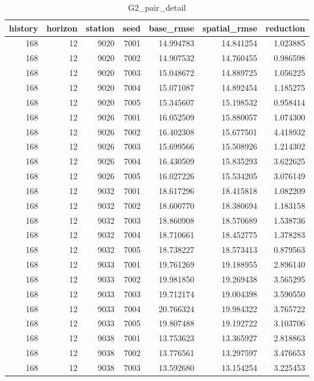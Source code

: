 \begin{table}
\caption{G2_pair_detail}
\label{tab:G2_pair_detail}
\begin{tabular}{rrrrrrr}
\toprule
history & horizon & station & seed & base\_rmse & spatial\_rmse & reduction \\
\midrule
168 & 12 & 9020 & 7001 & 14.994783 & 14.841254 & 1.023885 \\
168 & 12 & 9020 & 7002 & 14.907532 & 14.760455 & 0.986598 \\
168 & 12 & 9020 & 7003 & 15.048672 & 14.889725 & 1.056225 \\
168 & 12 & 9020 & 7004 & 15.071087 & 14.892454 & 1.185275 \\
168 & 12 & 9020 & 7005 & 15.345607 & 15.198532 & 0.958414 \\
168 & 12 & 9026 & 7001 & 16.052509 & 15.880057 & 1.074300 \\
168 & 12 & 9026 & 7002 & 16.402308 & 15.677501 & 4.418932 \\
168 & 12 & 9026 & 7003 & 15.699566 & 15.508926 & 1.214302 \\
168 & 12 & 9026 & 7004 & 16.430509 & 15.835293 & 3.622625 \\
168 & 12 & 9026 & 7005 & 16.027226 & 15.534205 & 3.076149 \\
168 & 12 & 9032 & 7001 & 18.617296 & 18.415818 & 1.082209 \\
168 & 12 & 9032 & 7002 & 18.600770 & 18.380694 & 1.183158 \\
168 & 12 & 9032 & 7003 & 18.860908 & 18.570689 & 1.538736 \\
168 & 12 & 9032 & 7004 & 18.710661 & 18.452775 & 1.378283 \\
168 & 12 & 9032 & 7005 & 18.738227 & 18.573413 & 0.879563 \\
168 & 12 & 9033 & 7001 & 19.761269 & 19.188955 & 2.896140 \\
168 & 12 & 9033 & 7002 & 19.981850 & 19.269438 & 3.565295 \\
168 & 12 & 9033 & 7003 & 19.712174 & 19.004398 & 3.590550 \\
168 & 12 & 9033 & 7004 & 20.766324 & 19.984322 & 3.765722 \\
168 & 12 & 9033 & 7005 & 19.807488 & 19.192722 & 3.103706 \\
168 & 12 & 9038 & 7001 & 13.753623 & 13.365927 & 2.818863 \\
168 & 12 & 9038 & 7002 & 13.776561 & 13.297597 & 3.476653 \\
168 & 12 & 9038 & 7003 & 13.592680 & 13.154254 & 3.225453 \\

\end{tabular}
\end{table}
